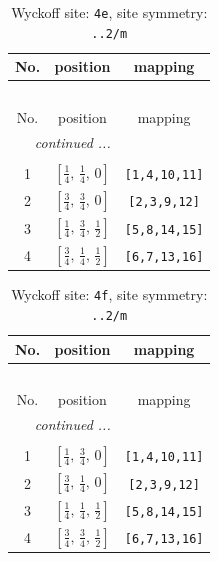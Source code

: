 \documentclass[fleqn,8pt]{jsarticle}
\begin{document}
\renewcommand{\arraystretch}{1.2}
\begin{longtable}{ccc}
\caption{Wyckoff site: {\tt 4e}, site symmetry: {\tt ..2/m}}
 \\
 \hline \hline
No. & position & mapping \\ \hline \endfirsthead

\multicolumn{2}{l}{\tablename\ \thetable{}} \\
 \hline \hline
No. & position & mapping \\ \hline \endhead

 \hline \hline
\multicolumn{2}{r}{\footnotesize\it continued ...} \\ \endfoot

 \hline \hline
\multicolumn{2}{r}{} \\ \endlastfoot

1 & $\left[ \frac{1}{4},\, \frac{1}{4},\, 0 \right]$ & {\tt [1,4,10,11]} \\ \hline
2 & $\left[ \frac{3}{4},\, \frac{3}{4},\, 0 \right]$ & {\tt [2,3,9,12]} \\ \hline
3 & $\left[ \frac{1}{4},\, \frac{3}{4},\, \frac{1}{2} \right]$ & {\tt [5,8,14,15]} \\ \hline
4 & $\left[ \frac{3}{4},\, \frac{1}{4},\, \frac{1}{2} \right]$ & {\tt [6,7,13,16]} \\
\end{longtable}
\renewcommand{\arraystretch}{1.2}
\begin{longtable}{ccc}
\caption{Wyckoff site: {\tt 4f}, site symmetry: {\tt ..2/m}}
 \\
 \hline \hline
No. & position & mapping \\ \hline \endfirsthead

\multicolumn{2}{l}{\tablename\ \thetable{}} \\
 \hline \hline
No. & position & mapping \\ \hline \endhead

 \hline \hline
\multicolumn{2}{r}{\footnotesize\it continued ...} \\ \endfoot

 \hline \hline
\multicolumn{2}{r}{} \\ \endlastfoot

1 & $\left[ \frac{1}{4},\, \frac{3}{4},\, 0 \right]$ & {\tt [1,4,10,11]} \\ \hline
2 & $\left[ \frac{3}{4},\, \frac{1}{4},\, 0 \right]$ & {\tt [2,3,9,12]} \\ \hline
3 & $\left[ \frac{1}{4},\, \frac{1}{4},\, \frac{1}{2} \right]$ & {\tt [5,8,14,15]} \\ \hline
4 & $\left[ \frac{3}{4},\, \frac{3}{4},\, \frac{1}{2} \right]$ & {\tt [6,7,13,16]} \\
\end{longtable}
\end{document}
